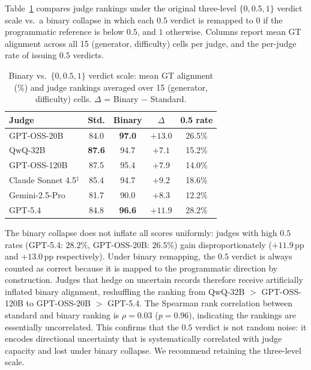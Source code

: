 Table~\ref{tab:abl-binary} compares judge rankings under the original three-level $\{0, 0.5, 1\}$ verdict scale vs.\ a binary collapse in which each $0.5$ verdict is remapped to $0$ if the programmatic reference is below $0.5$, and $1$ otherwise. Columns report mean GT alignment across all 15 (generator, difficulty) cells per judge, and the per-judge rate of issuing $0.5$ verdicts.

\begin{table}[t]
\centering
\footnotesize
\setlength{\tabcolsep}{3.5pt}
\renewcommand{\arraystretch}{0.95}


\begin{tabular*}{\columnwidth}{@{\extracolsep{\fill}}lcccc@{}}

\toprule

\textbf{Judge}
& \textbf{Std.}
& \textbf{Binary}
& \textbf{$\Delta$}
& \textbf{0.5 rate} \\

\midrule

GPT-OSS-20B
& 84.0 & \textbf{97.0} & $+13.0$ & 26.5\% \\

QwQ-32B
& \textbf{87.6} & 94.7 & $+7.1$ & 15.2\% \\

GPT-OSS-120B
& 87.5 & 95.4 & $+7.9$ & 14.0\% \\

Claude Sonnet 4.5$^{\ddagger}$
& 85.4 & 94.7 & $+9.2$ & 18.6\% \\

Gemini-2.5-Pro
& 81.7 & 90.0 & $+8.3$ & 12.2\% \\

GPT-5.4
& 84.8 & \textbf{96.6} & $+11.9$ & 28.2\% \\

\bottomrule

\end{tabular*}
\caption{Binary vs.\ $\{0,0.5,1\}$ verdict scale: mean GT alignment (\%) and judge rankings averaged over 15 (generator, difficulty) cells. $\Delta$ = Binary $-$ Standard.}
\label{tab:abl-binary}

\end{table}

The binary collapse does not inflate all scores uniformly: judges with high $0.5$ rates (GPT-5.4: $28.2\%$, GPT-OSS-20B: $26.5\%$) gain disproportionately ($+11.9$\,pp and $+13.0$\,pp respectively). Under binary remapping, the $0.5$ verdict is always counted as correct because it is mapped to the programmatic direction by construction. Judges that hedge on uncertain records therefore receive artificially inflated binary alignment, reshuffling the ranking from QwQ-32B $>$ GPT-OSS-120B to GPT-OSS-20B $>$ GPT-5.4. The Spearman rank correlation between standard and binary ranking is $\rho = 0.03$ ($p = 0.96$), indicating the rankings are essentially uncorrelated. This confirms that the $0.5$ verdict is not random noise: it encodes directional uncertainty that is systematically correlated with judge capacity and lost under binary collapse. We recommend retaining the three-level scale.

